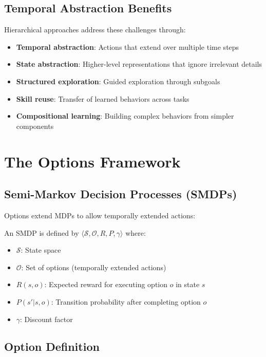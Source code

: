 \subsection{Temporal Abstraction Benefits}

Hierarchical approaches address these challenges through:

\begin{itemize}
    \item \textbf{Temporal abstraction}: Actions that extend over multiple time steps
    \item \textbf{State abstraction}: Higher-level representations that ignore irrelevant details
    \item \textbf{Structured exploration}: Guided exploration through subgoals
    \item \textbf{Skill reuse}: Transfer of learned behaviors across tasks
    \item \textbf{Compositional learning}: Building complex behaviors from simpler components
\end{itemize}

\section{The Options Framework}

\subsection{Semi-Markov Decision Processes (SMDPs)}

Options extend MDPs to allow temporally extended actions:

\begin{definition}
An SMDP is defined by $\langle \mathcal{S}, \mathcal{O}, R, P, \gamma \rangle$ where:
\begin{itemize}
    \item $\mathcal{S}$: State space
    \item $\mathcal{O}$: Set of options (temporally extended actions)
    \item $R(s, o)$: Expected reward for executing option $o$ in state $s$
    \item $P(s'|s, o)$: Transition probability after completing option $o$
    \item $\gamma$: Discount factor
\end{itemize}
\end{definition}

\subsection{Option Definition}

